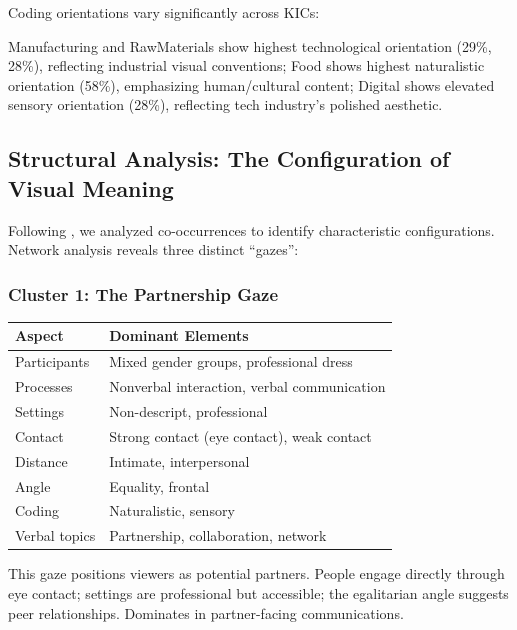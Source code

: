 \documentclass[../main.tex]{subfiles}
\begin{document}
Coding orientations vary significantly across KICs:


Manufacturing and RawMaterials show highest technological orientation (29\%, 28\%), reflecting industrial visual conventions; Food shows highest naturalistic orientation (58\%), emphasizing human/cultural content; Digital shows elevated sensory orientation (28\%), reflecting tech industry's polished aesthetic.

\subsection{Structural Analysis: The Configuration of Visual Meaning}

Following \textcite{hollerer2013imageries}, we analyzed co-occurrences to identify characteristic configurations. Network analysis reveals three distinct ``gazes'':

\subsubsection{Cluster 1: The Partnership Gaze}

\begin{center}
\small
\begin{tabular}{ll}
\toprule
\textbf{Aspect} & \textbf{Dominant Elements} \\
\midrule
Participants & Mixed gender groups, professional dress \\
Processes & Nonverbal interaction, verbal communication \\
Settings & Non-descript, professional \\
Contact & Strong contact (eye contact), weak contact \\
Distance & Intimate, interpersonal \\
Angle & Equality, frontal \\
Coding & Naturalistic, sensory \\
Verbal topics & Partnership, collaboration, network \\
\bottomrule
\end{tabular}
\end{center}

This gaze positions viewers as potential partners. People engage directly through eye contact; settings are professional but accessible; the egalitarian angle suggests peer relationships. Dominates in partner-facing communications.
\end{document}

